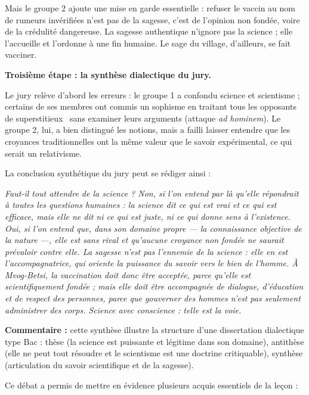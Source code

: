 \documentclass[11pt]{article}
\newcommand{\cle}[1]{{\popxbold\color{popdark}#1}}
\newcounter{popsec}
\newcounter{popsub}
\newcommand{\courssub}[1]{%
  \stepcounter{popsub}%
  \par\vspace{9pt}\noindent{\popxbold\fontsize{11.5}{13}\selectfont\color{popink}{\color{poporange}\thepopsec.\thepopsub}\hspace{6pt}#1}\par\nopagebreak\vspace{4pt}
}
\begin{document}
\begin{exoresolu}
Mais le groupe 2 ajoute une mise en garde essentielle : refuser le vaccin au nom de rumeurs invérifiées n'est pas de la sagesse, c'est de l'\cle{opinion} non fondée, voire de la crédulité dangereuse. La sagesse authentique n'ignore pas la science ; elle l'accueille et l'ordonne à une fin humaine. Le sage du village, d'ailleurs, se fait vacciner.

\textbf{Troisième étape : la synthèse dialectique du jury.}

Le jury relève d'abord les erreurs : le groupe 1 a confondu science et scientisme ; certains de ses membres ont commis un sophisme en traitant tous les opposants de \guillemotleft superstitieux \guillemotright\ sans examiner leurs arguments (attaque \emph{ad hominem}). Le groupe 2, lui, a bien distingué les notions, mais a failli laisser entendre que les croyances traditionnelles ont la même valeur que le savoir expérimental, ce qui serait un relativisme.

La conclusion synthétique du jury peut se rédiger ainsi :

\emph{Faut-il tout attendre de la science ? Non, si l'on entend par là qu'elle répondrait à toutes les questions humaines : la science dit ce qui est vrai et ce qui est efficace, mais elle ne dit ni ce qui est juste, ni ce qui donne sens à l'existence. Oui, si l'on entend que, dans son domaine propre --- la connaissance objective de la nature ---, elle est sans rival et qu'aucune croyance non fondée ne saurait prévaloir contre elle. La sagesse n'est pas l'ennemie de la science : elle en est l'accompagnatrice, qui oriente la puissance du savoir vers le bien de l'homme. À Mvog-Betsi, la vaccination doit donc être acceptée, parce qu'elle est scientifiquement fondée ; mais elle doit être accompagnée de dialogue, d'éducation et de respect des personnes, parce que gouverner des hommes n'est pas seulement administrer des corps. Science avec conscience : telle est la voie.}

\textbf{Commentaire :} cette synthèse illustre la structure d'une dissertation dialectique type Bac : thèse (la science est puissante et légitime dans son domaine), antithèse (elle ne peut tout résoudre et le scientisme est une doctrine critiquable), synthèse (articulation du savoir scientifique et de la sagesse).
\end{exoresolu}

\courssub{Bilan de l'activité}

Ce débat a permis de mettre en évidence plusieurs acquis essentiels de la leçon :
\end{document}
